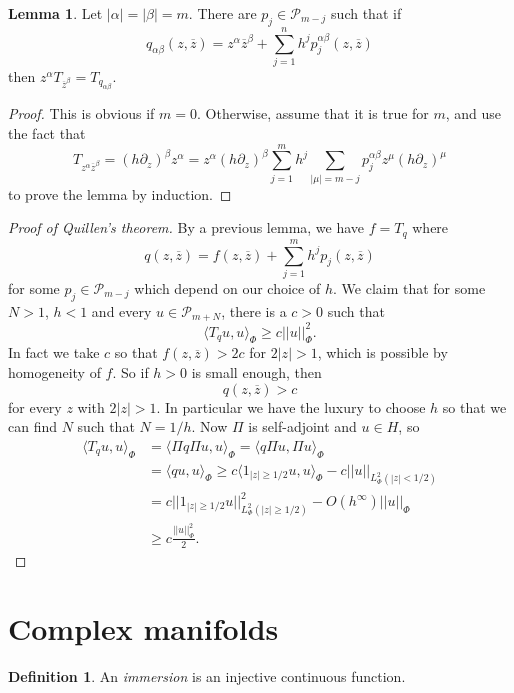 \documentclass[12pt]{report}
\newcommand{\dfn}[1]{\emph{#1}\index{#1}}
\theoremstyle{definition}
\newtheorem{lemma}[theorem]{Lemma}
\newtheorem{definition}[theorem]{Definition}
\begin{document}
\begin{lemma}
    Let $|\alpha| = |\beta| = m$. There are $p_j \in \mathcal P_{m - j}$ such that if
    $$q_{\alpha\beta}(z, \overline z) = z^\alpha \overline z^\beta + \sum_{j=1}^n h^j p_j^{\alpha\beta}(z, \overline z)$$
    then $z^\alpha T_{\overline z^\beta} = T_{q_{\alpha\beta}}$.
\end{lemma}
\begin{proof}
    This is obvious if $m = 0$. Otherwise, assume that it is true for $m$, and use the fact that
    $$T_{z^\alpha \overline z^\beta} = (h \partial_z)^\beta z^\alpha = z^\alpha(h\partial_z)^\beta \sum_{j=1}^m h^j \sum_{|\mu|=m-j} p_j^{\alpha\beta} z^\mu (h\partial_z)^\mu$$
    to prove the lemma by induction.
\end{proof}
\begin{proof}[Proof of Quillen's theorem]
    By a previous lemma, we have $f = T_q$ where
    $$q(z, \overline z) = f(z, \overline z) + \sum_{j=1}^m h^j p_j(z, \overline z)$$
    for some $p_j \in \mathcal P_{m - j}$ which depend on our choice of $h$. We claim that for some $N > 1$, $h < 1$ and every $u \in \mathcal P_{m + N}$, there is a $c > 0$ such that
    $$\langle T_qu, u\rangle_\Phi \geq c||u||^2_\Phi.$$
    In fact we take $c$ so that $f(z, \overline z) > 2c$ for $2|z| > 1$, which is possible by homogeneity of $f$. So if $h > 0$ is small enough, then
    $$q(z, \overline z) > c$$
    for every $z$ with $2|z| > 1$. In particular we have the luxury to choose $h$ so that we can find $N$ such that $N = 1/h$. Now $\Pi$ is self-adjoint and $u \in H$, so
\begin{align*}
    \langle T_qu, u\rangle_\Phi &= \langle \Pi q\Pi u, u\rangle_\Phi = \langle q\Pi u, \Pi u\rangle_\Phi \\
    &= \langle qu, u\rangle_\Phi \geq c\langle 1_{|z| \geq 1/2}u, u\rangle_\Phi - c||u||_{L^2_\Phi(|z| < 1/2)}\\
    &= c||1_{|z| \geq 1/2} u||_{L^2_\Phi(|z| \geq 1/2)}^2 - O(h^\infty)||u||_\Phi\\
    &\geq c\frac{||u||_\Phi^2}{2}.
\end{align*} 
\end{proof}

\section{Complex manifolds}
\begin{definition}
    An \dfn{immersion} is an injective continuous function.
\end{definition}
\end{document}
